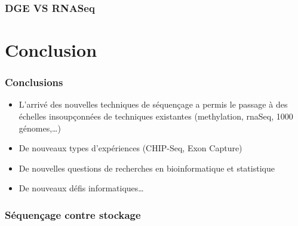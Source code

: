 \documentclass{beamer}
\begin{document}
\begin{frame}
	\frametitle{DGE VS RNASeq}
\end{frame}


\section{Conclusion} %
\label{sec:conclusion}

\begin{frame}
	\frametitle{Conclusions}
	\begin{itemize}
		\item L'arrivé des nouvelles techniques de séquençage a permis le passage à des échelles insoupçonnées de techniques existantes (methylation, rnaSeq, 1000 génomes,\ldots)
		\item De nouveaux types d'expériences (CHIP-Seq, Exon Capture) 
		\item De nouvelles questions de recherches en bioinformatique et statistique
		\item De nouveaux défis informatiques\ldots
	\end{itemize}
\end{frame}

\begin{frame}
	\frametitle{Séquençage contre stockage}
\end{frame}
\end{document}
